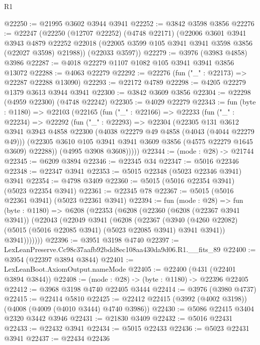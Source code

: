 \begin{lexlean}{R1}
\begin{coremodule}
@22250 := @21995 @3602 @3944 @3941
@22252 := @3842 @3598 @3856
@22276 := @22247
    (@22250
      (@12707 @22252)
      (@4748 @22171)
      (@22006
        @3601
        @3941
        @3943
        @4879
        @22252
        @22018
        (@22005 @3599 @105 @3941 @3941 @3598 @3856 (@22027 @3598) @21988))
      (@22033 @3597))
@22279 := @3976 (@3983 @4858) @3986
@22287 := @4018 @22279 @1107 @1082 @105 @3941 @3941 @3856 @13072
@22288 := @4063 @22279
@22292 := @22276 (fun ("_" : @22173) => @22287 @22288 @13090)
@22293 := @22172 @4789
@22298 := @4205 @22279 @1379 @3613 @3944 @3941
@22300 := @3842 @3609 @3856
@22304 := @22298 (@4959 @22300) (@4748 @22242)
@22305 := @4029 @22279
@22343 := fun (byte : @1180) =>
  @22103
    (@22165
      (fun ("_" : @22166) =>
      @22233
        (fun ("_" : @22234) =>
        @22292
          (fun ("_" : @22293) =>
          @22304
            (@22305
              @131
              @3612
              @3941
              @3943
              @4858
              @22300
              (@4038 @22279 @49 @4858 (@4043 (@4044 @22279 @49)))
              (@22305 @3610 @105 @3941 @3941 @3609 @3856 (@4575 @22279 @1645 @3609) @22288))
            (@4995 @3908 @3608)))))
@22344 := (mode : @28) -> @21744
@22345 := @6209 @3894
@22346 := @22345 @34
@22347 := @5016 @22346
@22348 := @22347 @3941
@22353 := @5015 @22348 (@5023 @22346 @3941) @3941
@22354 := @4798 @3409
@22360 := @5015 (@5016 @22354 @3941) (@5023 @22354 @3941)
@22361 := @22345 @78
@22367 := @5015 (@5016 @22361 @3941) (@5023 @22361 @3941)
@22394 := fun (mode : @28) =>
  fun (byte : @1180) =>
  @6208
    (@22353
      (@6208
        (@22360
          (@6208 (@22367 @3941 @3941))
          (@22043
            (@22049
              @3941
              (@6208
                (@22367
                  (@3940
                    (@4260 @22082)
                    (@5015 (@5016 @22085 @3941) (@5023 @22085 @3941) @3941 @3941))
                  @3941)))))))
@22396 := @3951 @3198 @4740
@22397 := LexLeanPreserve.Cc98c37aafb92bdd8ec108aa430da9d06.R1.__fits_89
@22400 := @3954 (@22397 @3894 @3844)
@22401 := LexLeanBoot.AxiomOutput.nameMode
@22405 := @22400 (@431 (@22401 @3894 @3844))
@22408 := (mode : @28) -> (byte : @1180) -> @22396 @22405
@22412 := @3968 @3198 @4740 @22405 @3444
@22414 := @3976 (@3980 @4737)
@22415 := @22414 @5810
@22425 := @22412 @22415 (@3992 (@4002 @3198)) (@4008 (@4009 (@4010 @3444) @4740 @3986))
@22430 := @5086 @22415 @3404 @2320 @3442 @3946
@22431 := @21830 @3409
@22432 := @5016 @22431
@22433 := @22432 @3941
@22434 := @5015 @22433
@22436 := @5023 @22431 @3941
@22437 := @22434 @22436

\end{coremodule}
\end{lexlean}
